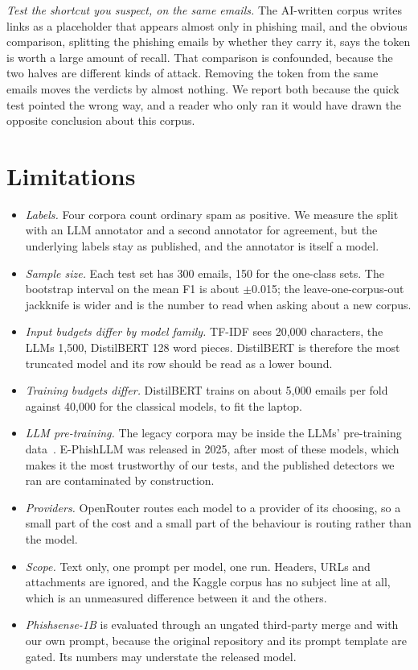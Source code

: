 \textit{Test the shortcut you suspect, on the same emails.} The AI-written
corpus writes links as a placeholder that appears almost only in phishing mail,
and the obvious comparison, splitting the phishing emails by whether they carry
it, says the token is worth a large amount of recall. That comparison is
confounded, because the two halves are different kinds of attack. Removing the
token from the same emails moves the verdicts by almost nothing. We report both
because the quick test pointed the wrong way, and a reader who only ran it
would have drawn the opposite conclusion about this corpus.

\section{Limitations}

\begin{itemize}
\item \textit{Labels.} Four corpora count ordinary spam as positive. We measure
the split with an LLM annotator and a second annotator for agreement, but the
underlying labels stay as published, and the annotator is itself a model.
\item \textit{Sample size.} Each test set has 300 emails, 150 for the one-class
sets. The bootstrap interval on the mean F1 is about $\pm$0.015; the
leave-one-corpus-out jackknife is wider and is the number to read when asking
about a new corpus.
\item \textit{Input budgets differ by model family.} TF-IDF sees 20{,}000
characters, the LLMs 1{,}500, DistilBERT 128 word pieces. DistilBERT is
therefore the most truncated model and its row should be read as a lower bound.
\item \textit{Training budgets differ.} DistilBERT trains on about 5{,}000
emails per fold against 40{,}000 for the classical models, to fit the laptop.
\item \textit{LLM pre-training.} The legacy corpora may be inside the LLMs'
pre-training data~\cite{contamsurvey}. E-PhishLLM was released in 2025, after
most of these models, which makes it the most trustworthy of our tests, and the
published detectors we ran are contaminated by construction.
\item \textit{Providers.} OpenRouter routes each model to a provider of its
choosing, so a small part of the cost and a small part of the behaviour is
routing rather than the model.
\item \textit{Scope.} Text only, one prompt per model, one run. Headers, URLs
and attachments are ignored, and the Kaggle corpus has no subject line at all,
which is an unmeasured difference between it and the others.
\item \textit{Phishsense-1B} is evaluated through an ungated third-party merge
and with our own prompt, because the original repository and its prompt
template are gated. Its numbers may understate the released model.
\end{itemize}

